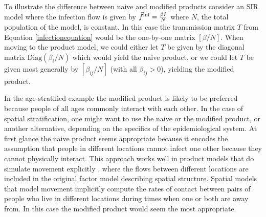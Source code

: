 \FloatBarrier

To illustrate the difference between naive and modified products consider an SIR model where the infection flow is given by $\vec{f}^\text{inf} = \frac{\beta I}{N}$ where $N$, the total population of the model, is constant. In this case the transmission matrix $T$ from Equation \ref{infectionequation} would be the one-by-one matrix $\left[ \beta/N \right]$.
When moving to the product model, we could either let $T$ be given by the diagonal matrix $\textrm{Diag}(\beta_i/N)$
which would yield the naive product, or we could let $T$ be given most generally by $\left[ \beta_{ij}/N \right]$
(with all $\beta_{ij}>0$), yielding the modified product.

In the age-stratified example the modified product is likely to be preferred because people of all ages commonly interact with each other. In the case of spatial stratification, one might want to use the naive or the modified product, or another alternative, depending on the specifics of the epidemiological system. At first glance the naive product seems appropriate because it encodes the assumption that people in different locations cannot infect one other because they cannot physically interact. This approach works well in product models that do simulate movement explicitly \cite[e.g.][]{mohammadi2023importation}, where the flows between different locations are included in the original factor model describing spatial structure. Spatial models that model movement implicitly \citep{dietz1995structured} compute the rates of contact between pairs of people who live in different locations during times when one or both are away from. In this case the modified product would seem the most appropriate.


